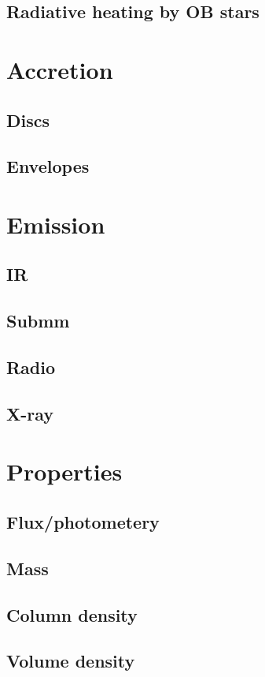\subsection{Radiative heating by OB stars}

\section{Accretion}
\subsection{Discs}
\subsection{Envelopes}

\section{Emission}
\subsection{IR}
\subsection{Submm}
\subsection{Radio}
\subsection{X-ray}

\section{Properties}
\subsection{Flux/photometery}
\subsection{Mass}
\subsection{Column density}
\subsection{Volume density}
